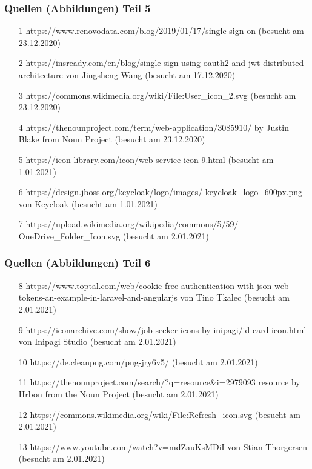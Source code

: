 \documentclass{beamer}
\begin{document}
\begin{frame}
\frametitle{Quellen (Abbildungen) Teil 5}
\begin{itemize}
\item [1] https://www.renovodata.com/blog/2019/01/17/single-sign-on (besucht am 23.12.2020)
\item [2]  https://insready.com/en/blog/single-sign-using-oauth2-and-jwt-distributed-architecture von Jingsheng Wang (besucht am 17.12.2020)
\item [3] https://commons.wikimedia.org/wiki/File:User\_icon\_2.svg (besucht am 23.12.2020)
\item [4] https://thenounproject.com/term/web-application/3085910/ by Justin Blake from Noun Project (besucht am 23.12.2020)
\item [5] https://icon-library.com/icon/web-service-icon-9.html (besucht am 1.01.2021)
\item [6] https://design.jboss.org/keycloak/logo/images/ keycloak\_logo\_600px.png von Keycloak (besucht am 1.01.2021)
\item [7] https://upload.wikimedia.org/wikipedia/commons/5/59/ OneDrive\_Folder\_Icon.svg (besucht am 2.01.2021)
\end{itemize}
\end{frame}

\begin{frame}
\frametitle{Quellen (Abbildungen) Teil 6}
\begin{itemize}
\item [8] https://www.toptal.com/web/cookie-free-authentication-with-json-web-tokens-an-example-in-laravel-and-angularjs von Tino Tkalec (besucht am 2.01.2021)
\item [9] https://iconarchive.com/show/job-seeker-icons-by-inipagi/id-card-icon.html von Inipagi Studio (besucht am 2.01.2021)
\item [10] https://de.cleanpng.com/png-jry6v5/ (besucht am 2.01.2021)
\item [11] https://thenounproject.com/search/?q=resource\&i=2979093 resource by Hrbon from the Noun Project (besucht am 2.01.2021)
\item [12] https://commons.wikimedia.org/wiki/File:Refresh\_icon.svg (besucht am 2.01.2021)
\item [13] https://www.youtube.com/watch?v=mdZauKsMDiI von Stian Thorgersen (besucht am 2.01.2021)
\end{itemize}
\end{frame}
\end{document}
